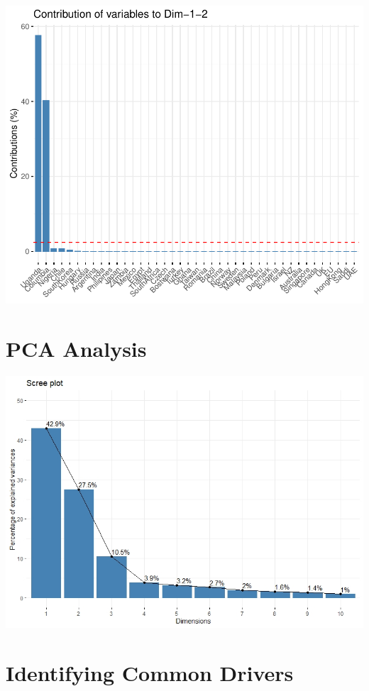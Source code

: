 \documentclass[11pt,preprint, authoryear]{elsarticle}
\let\origfigure\figure
\let\endorigfigure\endfigure
\renewenvironment{figure}[1][2] {
    \expandafter\origfigure\expandafter[H]
} {
    \endorigfigure
}
\numberwithin{equation}{section}
\numberwithin{figure}{section}
\numberwithin{table}{section}
\begin{document}
\includegraphics{Essay_files/figure-latex/unnamed-chunk-5-8.pdf}

\hypertarget{pca-analysis}{%
\section{PCA Analysis}\label{pca-analysis}}

\begin{figure}[h]
\centering
\includegraphics[width=\linewidth]{scree.jpg}
\caption{Scree plot}
\label{scree}
\end{figure}

\hypertarget{identifying-common-drivers}{%
\section{Identifying Common Drivers}\label{identifying-common-drivers}}
\end{document}
